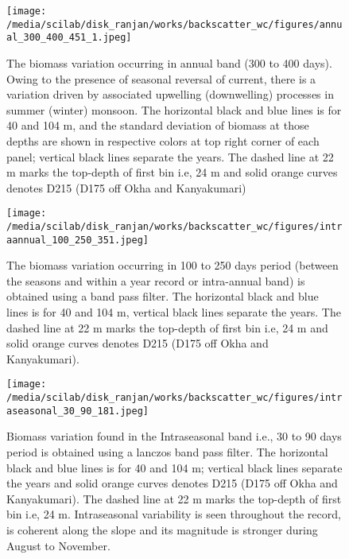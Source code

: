 \documentclass{article}
\begin{document}
\begin{figure}[htbp]
	\centering
	\texttt{[image: /media/scilab/disk\_ranjan/works/backscatter\_wc/figures/annual\_300\_400\_451\_1.jpeg]} 
	\captionsetup{justification=justified,font=footnotesize,skip=0.05\baselineskip,width=\textwidth}
	\caption{The biomass variation occurring in annual band (300 to 400 days). Owing to the presence of seasonal reversal of current, there is a variation driven by associated upwelling (downwelling) processes in summer (winter) monsoon. The horizontal black and blue lines is for 40 and 104 m, and the standard deviation of biomass at those depths are shown in respective colors at top right corner of each panel; vertical black lines separate the years. The dashed line at 22 m marks the top-depth of first bin i.e, 24 m and solid orange curves denotes D215 (D175 off Okha and Kanyakumari)}
	\label{fig:annual}
\end{figure}



\begin{figure}[htbp]
	\centering
	\texttt{[image: /media/scilab/disk\_ranjan/works/backscatter\_wc/figures/intraannual\_100\_250\_351.jpeg]} 
	\captionsetup{justification=justified,font=footnotesize,skip=0.05\baselineskip,width=\textwidth}
	\caption{The biomass variation occurring in 100 to 250 days period (between the seasons and within a year record or intra-annual band) is obtained using a band pass filter. The horizontal black and blue lines is for 40 and 104 m,
	vertical black lines separate the years. The dashed line at 22 m marks the top-depth of first bin i.e, 24 m and solid orange curves denotes D215 (D175 off Okha and Kanyakumari). }
	\label{fig:intraannual}
\end{figure}

\begin{figure}[htbp]
	\centering
	\texttt{[image: /media/scilab/disk\_ranjan/works/backscatter\_wc/figures/intraseasonal\_30\_90\_181.jpeg]} 
	\captionsetup{justification=justified,font=footnotesize,skip=0.05\baselineskip,width=\textwidth}
	\caption{Biomass variation found in the Intraseasonal band i.e., 30 to 90 days  period is obtained using a lanczos band pass filter. The horizontal black and blue lines is for 40 and 104 m;
	vertical black lines separate the years and solid orange curves denotes D215 (D175 off Okha and Kanyakumari). The dashed line at 22 m marks the top-depth of first bin i.e, 24 m. Intraseasonal variability is seen throughout the record, is coherent along the slope and its magnitude is stronger during August to November.}
	\label{fig:intraseasonal}
\end{figure}
\end{document}
